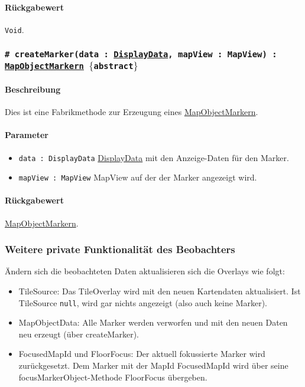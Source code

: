 \paragraph*{Rückgabewert}
\texttt{Void}.

\subsubsection*{\texttt{\# createMarker(data : \hyperref[App_Map_Util_DisplayData]{DisplayData}, mapView : MapView) : \hyperref[App_Map_View_MapObjectMarker]{MapObjectMarkern} $\lbrace$abstract$\rbrace$}}%
\paragraph*{Beschreibung}
Dies ist eine Fabrikmethode zur Erzeugung eines \hyperref[App_Map_View_MapObjectMarker]{MapObjectMarkern}.
\paragraph*{Parameter}
\begin{itemize}
    \item \texttt{data : DisplayData} \hyperref[App_Map_Util_DisplayData]{DisplayData} mit den Anzeige-Daten für den Marker.
    \item \texttt{mapView : MapView} MapView auf der der Marker angezeigt wird.
\end{itemize}
\paragraph*{Rückgabewert}
\hyperref[App_Map_View_MapObjectMarker]{MapObjectMarkern}.


\subsubsection*{Weitere private Funktionalität des Beobachters}
Ändern sich die beobachteten Daten aktualisieren sich die Overlays wie folgt:
\begin{itemize}
    \item TileSource: Das TileOverlay wird mit den neuen Kartendaten aktualisiert.
    Ist TileSource \texttt{null}, wird gar nichts angezeigt (also auch keine Marker).
    \item MapObjectData: Alle Marker werden verworfen und mit den neuen Daten neu erzeugt (über createMarker).
    \item FocusedMapId und FloorFocus: Der aktuell fokussierte Marker wird zurückgesetzt.
    Dem Marker mit der MapId FocusedMapId wird über seine focusMarkerObject-Methode FloorFocus übergeben.
\end{itemize}

